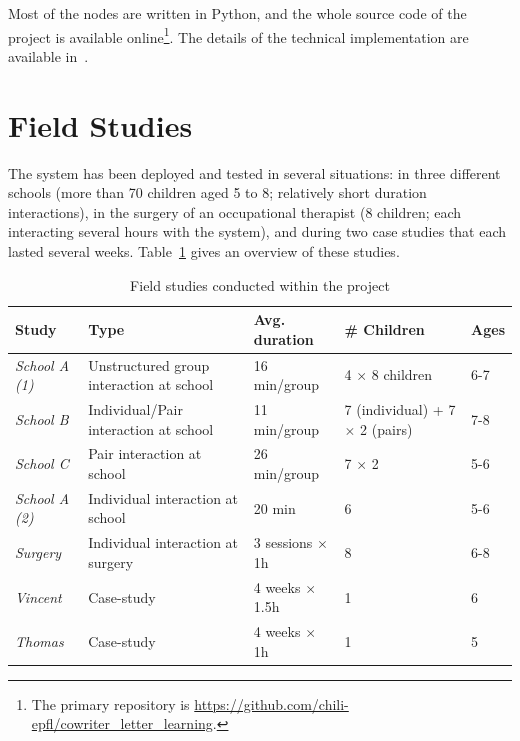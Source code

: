 \documentclass{article}
\begin{document}
Most of the nodes are written in Python, and the whole source code of the
project is available online\footnote{The primary repository is
\url{https://github.com/chili-epfl/cowriter_letter_learning}.}. The details of
the technical implementation are available in~\cite{hood2015when}.


\section{Field Studies}

The system has been deployed and tested in several situations: in three
different schools (more than 70 children aged 5 to 8; relatively short duration
interactions), in the surgery of an occupational therapist (8 children; each
interacting several hours with the system), and during two case studies that
each lasted several weeks. Table~\ref{studies} gives an overview of these
studies.

\begin{table}[ht!]
\centering
\caption{\small Field studies conducted within the project}
\label{studies}
\footnotesize
\begin{tabular}{@{}lp{4cm}p{2.2cm}p{2cm}l@{}}
\toprule
{\bf Study}        & {\bf Type}                               & {\bf Avg. duration}    & {\bf \# Children}                     & {\bf Ages} \\ \midrule
{\it School A (1)} & Unstructured group interaction at school & 16 min/group           & 4 $\times$ 8 children                 & 6-7        \\
{\it School B}     & Individual/Pair interaction at school    & 11 min/group           & 7 (individual) + 7 $\times$ 2 (pairs) & 7-8        \\
{\it School C}     & Pair interaction at school               & 26 min/group           & 7 $\times$ 2                          & 5-6        \\
{\it School A (2)} & Individual interaction at school         & 20 min                 & 6                                     & 5-6        \\ \midrule
{\it Surgery}      & Individual interaction at surgery        & 3 sessions $\times$ 1h & 8                                     & 6-8        \\ \midrule 
{\it Vincent}      & Case-study                               & 4 weeks $\times$ 1.5h  & 1                                     & 6          \\
{\it Thomas}       & Case-study                               & 4 weeks $\times$ 1h    & 1                                     & 5          \\ \bottomrule
\end{tabular}
\end{table}
\end{document}
